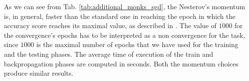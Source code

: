             \begin{table}[H]
                \centering
                \begin{subtable}{\textwidth}
                \end{subtable}
                \caption{Additional statistics for the Stochastic Gradient Descent.}
                \label{tab:additional_monks_sgd}
            \end{table}

            As we can see from Tab. \ref{tab:additional_monks_sgd}, the Nesterov's momentum is, in general, faster
            than the standard one in reaching the epoch in which the accuracy score reaches its maximal value, as
            described in \cite{Goodfellow-et-al-2016,Sutskever:2013:IIM:3042817.3043064}. The value of $1000$ for
            the convergence's epochs has to be interpreted as a non convergence for the task, since $1000$ is the
            maximal number of epochs that we have used for the training and the testing phases. The average time of
            execution of the train and backpropagation phases are computed in seconds. Both the momentum choices
            produce similar results.

